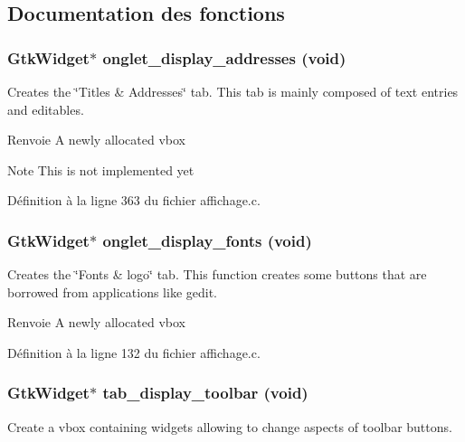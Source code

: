 \subsection{Documentation des fonctions}
\subsubsection[{onglet\_\-display\_\-addresses}]{\setlength{\rightskip}{0pt plus 5cm}GtkWidget$\ast$ onglet\_\-display\_\-addresses (void)}\label{affichage_8c_a8188edfa1a69ab92d5aee186855442b8}
Creates the \char`\"{}Titles \& Addresses\char`\"{} tab. This tab is mainly composed of text entries and editables.

\begin{DoxyReturn}{Renvoie}
A newly allocated vbox 
\end{DoxyReturn}


\begin{DoxyNote}{Note}
This is not implemented yet 
\end{DoxyNote}




Définition à la ligne 363 du fichier affichage.c.

\subsubsection[{onglet\_\-display\_\-fonts}]{\setlength{\rightskip}{0pt plus 5cm}GtkWidget$\ast$ onglet\_\-display\_\-fonts (void)}\label{affichage_8c_ab7ab35642d20a97b0129dc7df997c989}
Creates the \char`\"{}Fonts \& logo\char`\"{} tab. This function creates some buttons that are borrowed from applications like gedit.

\begin{DoxyReturn}{Renvoie}
A newly allocated vbox 
\end{DoxyReturn}


Définition à la ligne 132 du fichier affichage.c.

\subsubsection[{tab\_\-display\_\-toolbar}]{\setlength{\rightskip}{0pt plus 5cm}GtkWidget$\ast$ tab\_\-display\_\-toolbar (void)}\label{affichage_8c_ad383c9540bfca50409800d2d9869c3ac}
Create a vbox containing widgets allowing to change aspects of toolbar buttons.

